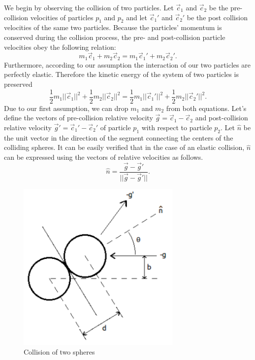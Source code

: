 We begin by observing the collision of two particles. Let $\vec{c}_1$ and $\vec{c}_2$ be the pre-collision velocities of particles $p_1$ and $p_2$ and let $\vec{c}_1'$ and $\vec{c}_2'$ be the post collision velocities of the same two particles. Because the particles' momentum is conserved during the collision process, the pre- and post-collision particle velocities obey the following relation:
%
\begin{equation}
m_1 \vec{c}_1 + m_2 \vec{c}_2 = m_1 \vec{c}_1' + m_2 \vec{c}_2'.
\end{equation}
%
Furthermore, according to our assumption the interaction of our two particles are perfectly elastic. Therefore the kinetic energy of the system of two particles is preserved
%
\begin{equation}
\frac{1}{2} m_1 ||\vec{c}_1||^2 + \frac{1}{2} m_2 ||\vec{c}_2||^2 = \frac{1}{2} m_1 ||\vec{c}_1'||^2 + \frac{1}{2} m_2 ||\vec{c}_2'||^2.
\end{equation}
%
Due to our first assumption, we can drop $m_1$ and $m_2$ from both equations. Let's define the vectors of pre-collision relative velocity $\vec{g} = \vec{c}_1 - \vec{c}_2$ and post-collision relative velocity $\vec{g}' = \vec{c}_1' - \vec{c}_2'$ of particle $p_1$ with respect to particle $p_2$. Let $\hat{n}$ be the unit vector in the direction of the segment connecting the centers of the colliding spheres. It can be easily verified that in the case of an elastic collision, $\hat{n}$ can be expressed using the vectors of relative velocities as follows.
%
\begin{equation}
\hat{n} = \frac{\vec{g} - \vec{g}'}{||\vec{g} - \vec{g}'||}.
\end{equation}
%
\begin{figure}[h!]
\label{colliding_spheres}
\centering
  \includegraphics[angle=0,width=80mm]{Boltzmann/colliding_spheres.pdf}
\caption{Collision of two spheres}
\end{figure}
